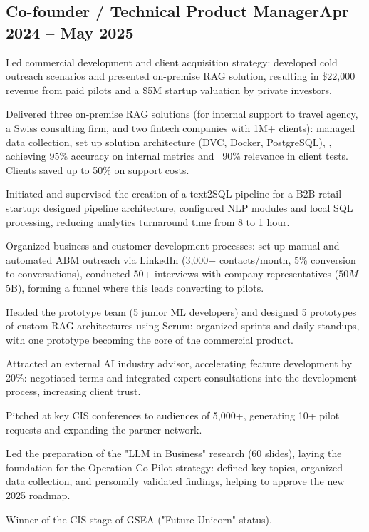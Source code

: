 \documentclass[a4paper,12pt]{article}
\begin{document}
\subsection{{Co-founder / Technical Product Manager}\hfill Apr 2024 -- May 2025}
\begin{zitemize}
\item Led commercial development and client acquisition strategy: developed cold outreach scenarios and presented on-premise RAG solution, resulting in \$22,000 revenue from paid pilots and a \$5M startup valuation by private investors.
\item Delivered three on-premise RAG solutions (for internal support to travel agency, a Swiss consulting firm, and two fintech companies with 1M+ clients): managed data collection, set up solution architecture (DVC, Docker, PostgreSQL), , achieving 95\% accuracy on internal metrics and ~90\% relevance in client tests. Clients saved up to 50\% on support costs.
\item Initiated and supervised the creation of a text2SQL pipeline for a B2B retail startup: designed pipeline architecture, configured NLP modules and local SQL processing, reducing analytics turnaround time from 8 to 1 hour.
\item Organized business and customer development processes: set up manual and automated ABM outreach via LinkedIn (3,000+ contacts/month, 5\% conversion to conversations), conducted 50+ interviews with company representatives ($50M–$5B), forming a funnel where this leads converting to pilots.
\item Headed the prototype team (5 junior ML developers) and designed 5 prototypes of custom RAG architectures using Scrum: organized sprints and daily standups, with one prototype becoming the core of the commercial product.
\item Attracted an external AI industry advisor, accelerating feature development by 20\%: negotiated terms and integrated expert consultations into the development process, increasing client trust.
\item Pitched at key CIS conferences to audiences of 5,000+, generating 10+ pilot requests and expanding the partner network.
\item Led the preparation of the "LLM in Business" research (60 slides), laying the foundation for the Operation Co-Pilot strategy: defined key topics, organized data collection, and personally validated findings, helping to approve the new 2025 roadmap.
\item Winner of the CIS stage of GSEA ("Future Unicorn" status).
\end{zitemize}
\end{document}
